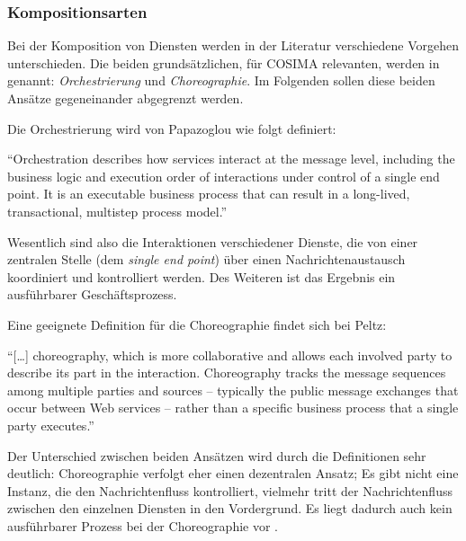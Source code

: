 \subsubsection{Kompositionsarten} %
\label{ssub:kompositionsarten}

  Bei der Komposition von Diensten werden in der Literatur verschiedene Vorgehen unterschieden. Die beiden grundsätzlichen, für COSIMA relevanten, werden in \citep[S. 41]{papazoglou2007soc} genannt: \emph{Orchestrierung} und \emph{Choreographie}. Im Folgenden sollen diese beiden Ansätze gegeneinander abgegrenzt werden.
  
  Die Orchestrierung wird von Papazoglou wie folgt definiert:
  
  \begin{definition}[Orchestrierung]\label{def:orchestrierung}
    "`Orchestration describes how services interact at the message level, including the business logic and execution order of interactions under control of a single end point. It is an executable business process that can result in a long-lived, transactional, multistep process model."' \emph{\citep[S. 41]{papazoglou2007soc}}
  \end{definition}
  
  Wesentlich sind also die Interaktionen verschiedener Dienste, die von einer zentralen Stelle (dem \emph{single end point}) über einen Nachrichtenaustausch koordiniert und kontrolliert werden. Des Weiteren ist das Ergebnis ein ausführbarer Geschäftsprozess.

  Eine geeignete Definition für die Choreographie findet sich bei Peltz:

  \begin{definition}[Choreographie]\label{def:choreographie}
    "`[\ldots] choreography, which is more collaborative and allows each involved party to describe its part in the interaction. Choreography tracks the message sequences among multiple parties and sources -- typically the public message exchanges that occur between Web services -- rather than a specific business process that a single party executes."' \emph{\citep[S. 46]{peltz2003wso}}
  \end{definition}

  Der Unterschied zwischen beiden Ansätzen wird durch die Definitionen sehr deutlich: Choreographie verfolgt eher einen dezentralen Ansatz; Es gibt nicht eine Instanz, die den Nachrichtenfluss kontrolliert, vielmehr tritt der Nachrichtenfluss zwischen den einzelnen Diensten in den Vordergrund. Es liegt dadurch auch kein ausführbarer Prozess bei der Choreographie vor \citep[S. 46]{peltz2003wso}.
  
